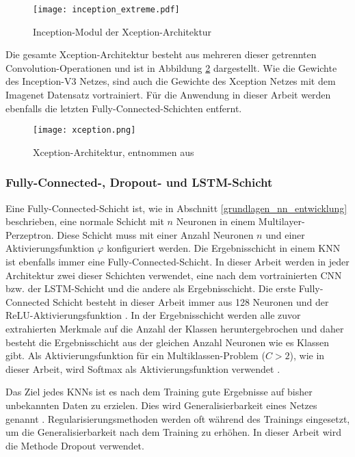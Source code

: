 \begin{figure}[h]
\centering
\texttt{[image: inception\_extreme.pdf]}
\caption{Inception-Modul der Xception-Architektur \cite{chollet2017xception}}
\label{fig_inception_extreme}
\end{figure}

Die gesamte Xception-Architektur besteht aus mehreren dieser getrennten Convolution-Operationen und ist in Abbildung \ref{fig_xception} dargestellt. Wie die Gewichte des Inception-V3 Netzes, sind auch die Gewichte des Xception Netzes mit dem Imagenet Datensatz vortrainiert. Für die Anwendung in dieser Arbeit werden ebenfalls die letzten Fully-Connected-Schichten entfernt.

\begin{figure}[h]
\centering
\texttt{[image: xception.png]}
\caption{Xception-Architektur, entnommen aus \cite{chollet2017xception}}
\label{fig_xception}
\end{figure}

\subsubsection{Fully-Connected-, Dropout- und \ac{LSTM}-Schicht}

Eine Fully-Connected-Schicht ist, wie in Abschnitt \ref{grundlagen_nn_entwicklung} beschrieben, eine normale Schicht mit $n$ Neuronen in einem Multilayer-Perzeptron. Diese Schicht muss mit einer Anzahl  Neuronen $n$ und einer Aktivierungsfunktion $\varphi$ konfiguriert werden. Die Ergebnisschicht in einem \ac{KNN} ist ebenfalls immer eine Fully-Connected-Schicht. In dieser Arbeit werden in jeder Architektur zwei dieser Schichten verwendet, eine nach dem vortrainierten \ac{CNN} bzw. der \ac{LSTM}-Schicht und die andere als Ergebnisschicht. Die erste Fully-Connected Schicht besteht in dieser Arbeit immer aus 128 Neuronen und der \ac{ReLU}-Aktivierungsfunktion \cite{nair2010rectified}. In der Ergebnisschicht werden alle zuvor extrahierten Merkmale auf die Anzahl der Klassen heruntergebrochen und daher besteht die Ergebnisschicht aus der gleichen Anzahl Neuronen wie es Klassen gibt. Als Aktivierungsfunktion für ein Multiklassen-Problem ($C>2$), wie in dieser Arbeit, wird Softmax als Aktivierungsfunktion verwendet \cite{bishop2006pattern}.

Das Ziel jedes \acp{KNN} ist es nach dem Training gute Ergebnisse auf bisher unbekannten Daten zu erzielen. Dies wird Generalisierbarkeit eines Netzes genannt \cite{bishop2006pattern}. Regularisierungsmethoden werden oft während des Trainings eingesetzt, um die Generalisierbarkeit nach dem Training zu erhöhen. In dieser Arbeit wird die Methode Dropout \cite{srivastava2014dropout} verwendet.

